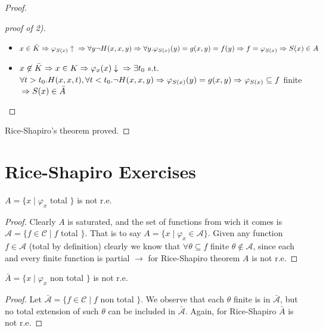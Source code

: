 \begin{proof}
\begin{proof}[proof of 2)]
    \begin{itemize}
    \item $ x\in\bar{K}\\ \Rightarrow\varphi_{S(x)}\uparrow \\
      \Rightarrow\forall y\lnot H(x,x,y)\\ \Rightarrow \forall
      y.\varphi_{S(x)}(y) = g(x,y) = f(y)\\ \Rightarrow f = \varphi_{S(x)}\\
      \Rightarrow S(x)\in A$
    \item
      $ x\not\in\bar{K}\\ \Rightarrow x\in K\\ \Rightarrow
      \varphi_x(x)\downarrow\\ \Rightarrow \exists t_0 $ s.t.
      $ \forall
      t>t_0. H(x,x,t), \forall t<t_0. \lnot H(x,x,y)\\
      \Rightarrow\varphi_{S(x)}(y) = g(x,y)\\ \Rightarrow
      \varphi_{S(x)}\subseteq f$ finite
      $\\ \Rightarrow S(x) \in \bar{A} $
    \end{itemize}
  \end{proof}

  Rice-Shapiro's theorem proved.
\end{proof}

\section{Rice-Shapiro Exercises}

\begin{example}\label{exe:rice1}
  $A = \{ x \mid \varphi_x $ total $\}$ is not r.e.

  \begin{proof}
    Clearly $A$ is saturated, and the set of functions from wich it
    comes is $\mathcal{A} = \{f \in \mathcal{C} \mid f $ total
    $\}$. That is to say $A = \{x \mid \varphi_x \in
    \mathcal{A}\}$. Given any function $f \in \mathcal{A}$ (total by
    definition) clearly we know that $\forall \theta \subseteq f$
    finite $\theta \notin \mathcal{A}$, since each and every finite
    function is partial $\rightarrow$ for Rice-Shapiro theorem $A$ is
    not r.e.
  \end{proof}
\end{example}

\begin{example}\label{exe:rice2}
  $\bar{A} = \{x \mid \varphi_x $ non total $\}$ is not r.e.

  \begin{proof}
    Let $\bar{\mathcal{A}} = \{f \in \mathcal{C} \mid f $ non total
    $\}$. We observe that each $\theta$ finite is in
    $\bar{\mathcal{A}}$, but no total extension of such $\theta$ can
    be included in $\bar{\mathcal{A}}$. Again, for Rice-Shapiro
    $\bar{A}$ is not r.e.
  \end{proof}
\end{example}


